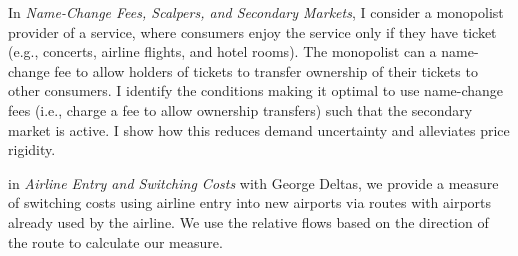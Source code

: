 \documentclass[12pt]{article}
\begin{document}
In \emph{Name-Change Fees, Scalpers, and Secondary Markets}, I consider a monopolist provider of a service, where consumers enjoy the service only if they have ticket (e.g., concerts, airline flights, and hotel rooms).
The monopolist can a name-change fee to allow holders of tickets to transfer ownership of their tickets to other consumers.
I identify the conditions making it optimal to use name-change fees (i.e., charge a fee to allow ownership transfers) such that the secondary market is active. I show how this reduces demand uncertainty and alleviates price rigidity.

in \emph{Airline Entry and Switching Costs} with George Deltas, we provide a measure of switching costs using airline entry into new airports via routes with airports already used by the airline. We use the relative flows based on the direction of the route to calculate our measure.
\end{document}

